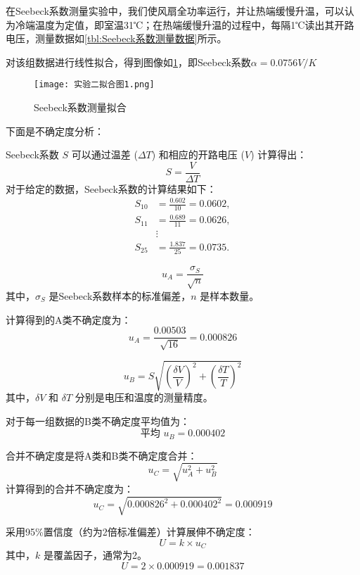 \documentclass[dvipsnames, svgnames,a4paper,11pt]{article}
\begin{document}
        在Seebeck系数测量实验中，我们使风扇全功率运行，并让热端缓慢升温，可以认为冷端温度为定值，即室温31℃；在热端缓慢升温的过程中，每隔1℃读出其开路电压，测量数据如\cref{tbl:Seebeck系数测量数据}所示。

        对该组数据进行线性拟合，得到图像如\cref{fig:实验二拟合图1}，即Seebeck系数$\alpha = 0.0756 V/K$


        
        \begin{figure}[htbp]
            \centering
            \texttt{[image: 实验二拟合图1.png]}
            \caption{Seebeck系数测量拟合}
            \label{fig:实验二拟合图1}
        \end{figure}

        下面是不确定度分析：

        Seebeck系数 \(S\) 可以通过温差 (\( \Delta T \)) 和相应的开路电压 (\( V \)) 计算得出：
        \[ S = \frac{V}{\Delta T} \]
        对于给定的数据，Seebeck系数的计算结果如下：
        \begin{align*}
        S_{10} &= \frac{0.602}{10} = 0.0602, \\
        S_{11} &= \frac{0.689}{11} = 0.0626, \\
        &\vdots \\
        S_{25} &= \frac{1.837}{25} = 0.0735.
        \end{align*}

        \[ u_A = \frac{\sigma_S}{\sqrt{n}} \]
        其中，\( \sigma_S \) 是Seebeck系数样本的标准偏差，\( n \) 是样本数量。

        计算得到的A类不确定度为：
        \[ u_A = \frac{0.00503}{\sqrt{16}} = 0.000826 \]

        \[ u_B = S \sqrt{\left(\frac{\delta V}{V}\right)^2 + \left(\frac{\delta T}{T}\right)^2} \]
        其中，\( \delta V \) 和 \( \delta T \) 分别是电压和温度的测量精度。

        对于每一组数据的B类不确定度平均值为：
        \[ \text{平均 } u_B = 0.000402 \]

        合并不确定度是将A类和B类不确定度合并：
        \[ u_C = \sqrt{u_A^2 + u_B^2} \]
        计算得到的合并不确定度为：
        \[ u_C = \sqrt{0.000826^2 + 0.000402^2} = 0.000919 \]

        采用95\%置信度（约为2倍标准偏差）计算展伸不确定度：
        \[ U = k \times u_C \]
        其中，\( k \) 是覆盖因子，通常为2。
        \[ U = 2 \times 0.000919 = 0.001837 \]
\end{document}
